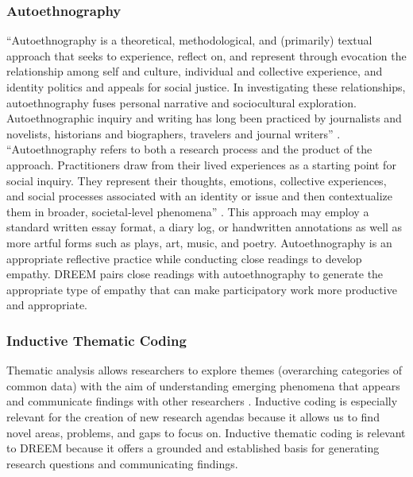 \subsubsection{Autoethnography}
``Autoethnography is a theoretical, methodological, and (primarily) textual approach that seeks to experience, reflect on, and represent through evocation the relationship among self and culture, individual and collective experience, and identity politics and appeals for social justice. In investigating these relationships, autoethnography fuses personal narrative and sociocultural exploration. Autoethnographic inquiry and writing has long been practiced by journalists and novelists, historians and biographers, travelers and journal writers'' \cite{holmanjonesAutoethnography2007}. ``Autoethnography refers to both a research process and the product of the approach. Practitioners draw from their lived experiences as a starting point for social inquiry. They represent their thoughts, emotions, collective experiences, and social processes associated with an identity or issue and then contextualize them in broader, societal‐level phenomena'' \cite{ramboAutoethnography2020}. This approach may employ a standard written essay format, a diary log, or handwritten annotations as well as more artful forms such as plays, art, music, and poetry. Autoethnography is an appropriate reflective practice while conducting close readings to develop empathy. DREEM pairs close readings with autoethnography to generate the appropriate type of empathy that can make participatory work more productive and appropriate.

\subsubsection{Inductive Thematic Coding}
Thematic analysis allows researchers to explore themes (overarching categories of common data) with the aim of  understanding emerging phenomena that appears and communicate findings with other researchers \cite{guestAppliedThematicAnalysis2012}. Inductive coding is especially relevant for the creation of new research agendas because it allows us to find novel areas, problems, and gaps to focus on. Inductive thematic coding is relevant to DREEM because it offers a grounded and established basis for generating research questions and communicating findings.

